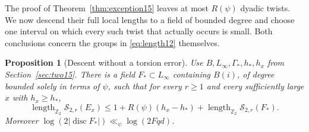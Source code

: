 \documentclass[a4paper,11pt]{article}
\newtheorem{proposition}{Proposition}[section]
\theoremstyle{definition}
\theoremstyle{remark}
\newcommand{\ZZ}{\mathbb Z}\newcommand{\ord}{\operatorname{ord}}
\newcommand{\len}{\operatorname{length}}\newcommand{\Res}{\operatorname*{Res}}
\numberwithin{equation}{section}
\begin{document}
The proof of Theorem~\ref{thm:exception15} leaves at most \(R(\psi)\) dyadic twists. We now descend their full local lengths to a field of bounded degree and choose one interval on which every such twist that actually occurs is small. Both conclusions concern the groups in \eqref{eq:length12} themselves.

\begin{proposition}[Descent without a torsion error]\label{prop:desc16}
Use \(B,L_\infty,\Gamma_*,h_*,h_x\) from Section~\ref{sec:two15}. There is a field \(F_*\subset L_\infty\) containing \(B(i)\), of degree bounded solely in terms of \(\psi\), such that for every \(r\ge1\) and every sufficiently large \(x\) with \(h_x\ge h_*\),
\[
 \len_{\ZZ_2}\mathcal S_{2,r}(E_x)
 \le 1+ R(\psi)(h_x-h_*)+
                   \len_{\ZZ_2}\mathcal S_{2,r}(F_*).
\]
Moreover \(\log(2|\operatorname{disc}F_*|)\ll_\psi\log(2Fqd)\).
\end{proposition}
\end{document}

